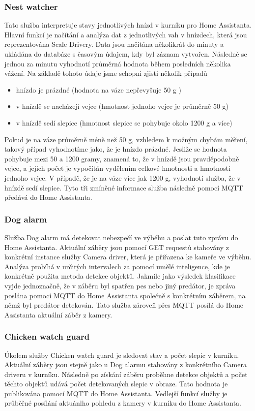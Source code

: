 \subsubsection{Nest watcher}
Tato služba interpretuje stavy jednotlivých hnízd v kurníku pro Home Assistanta.
Hlavní funkcí je načítání a analýza dat z jednotlivých vah v hnízdech, která jsou reprezentována Scale Drivery.\newline
Data jsou načítána několikrát do minuty a ukládána do databáze s časovým údajem, kdy byl záznam vytvořen.
Následně se jednou za minutu vyhodnotí průměrná hodnota během posledních několika vážení.
Na základě tohoto údaje jsme schopni zjisti několik případů
\begin{itemize}
    \item hnízdo je prázdné (hodnota na váze nepřevyšuje 50 g )
    \item v hnízdě se nacházejí vejce (hmotnost jednoho vejce je průměrně 50 g)
    \item v hnízdě sedí slepice (hmotnost slepice se pohybuje okolo 1200 g a více)
\end{itemize}
Pokud je na váze průměrně méně než 50 g, vzhledem k možným chybám měření, takový případ vyhodnotíme jako, že je hnízdo prázdné.
Jesliže se hodnota pohybuje mezi 50 a 1200 gramy, znamená to, že v hnízdě jsou pravděpodobně vejce, a jejich počet je vypočítán vydělením celkové hmotnosti a hmotnosti jednoho vejce.
V případě, že je na váze více jak 1200 g, vyhodnotí služba, že v hnízdě sedí slepice.
Tyto tři zmíněné informace služba následně pomocí MQTT předává do Home Assistanta.

\subsubsection{Dog alarm}
Služba Dog alarm má detekovat nebezpečí ve výběhu a poslat tuto zprávu do Home Assistanta.\newline
Aktuální záběry jsou pomocí GET requestů stahovány z konkrétní instance služby Camera driver, která je přiřazena ke kameře ve výběhu.
Analýza probíhá v určitých intervalech za pomocí umělé inteligence, kde je konkrétně použita metoda detekce objektů.
Jakmile jako výsledek klasifikace vyjde jednoznačně, že v záběru byl spatřen pes nebo jiný predátor, je zpráva poslána pomocí MQTT do Home Assistanta společně s konkrétním záběrem, na němž byl predátor detekován.
Tato služba zároveň přes MQTT posílá do Home Assistanta aktuální záběr z kamery.


\subsubsection{Chicken watch guard}
Úkolem služby Chicken watch guard je sledovat stav a počet slepic v kurníku.\newline
Aktuální záběry jsou stejně jako u Dog alarmu stahovány z konkrétního Camera driveru v kurníku.
Následně po získání záběru proběhne detekce objektů a počet těchto objektů udává počet detekovaných slepic v obraze.
Tato hodnota je publikována pomocí MQTT do Home Assistanta.
Vedlejší funkcí služby je průběřné posílání aktuánlho pohledu z kamery v kurníku do Home Assistanta.

